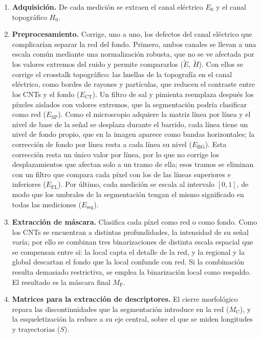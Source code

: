 \begin{enumerate}
    \item \textbf{Adquisición.} De cada medición se extraen el canal eléctrico $E_0$ y el canal topográfico $H_0$.
    \item \textbf{Preprocesamiento.} Corrige, uno a uno, los defectos del canal eléctrico que complicarían separar la red del fondo. Primero, ambos canales se llevan a una escala común mediante una normalización robusta, que no se ve afectada por los valores extremos del ruido y permite compararlos ($\tilde E$, $\tilde H$). Con ellos se corrige el crosstalk topográfico: las huellas de la topografía en el canal eléctrico, como bordes de rayones y partículas, que reducen el contraste entre los CNTs y el fondo ($E_{\mathrm{CT}}$). Un filtro de sal y pimienta reemplaza después los píxeles aislados con valores extremos, que la segmentación podría clasificar como red ($E_{\mathrm{SP}}$). Como el microscopio adquiere la matriz línea por línea y el nivel de base de la señal se desplaza durante el barrido, cada línea tiene un nivel de fondo propio, que en la imagen aparece como bandas horizontales; la corrección de fondo por línea resta a cada línea su nivel ($E_{\mathrm{BG}}$). Esta corrección resta un único valor por línea, por lo que no corrige los desplazamientos que afectan solo a un tramo de ella; esos tramos se eliminan con un filtro que compara cada píxel con los de las líneas superiores e inferiores ($E_{\mathrm{FL}}$). Por último, cada medición se escala al intervalo $[0,1]$, de modo que los umbrales de la segmentación tengan el mismo significado en todas las mediciones ($E_{\mathrm{seg}}$).
    \item \textbf{Extracción de máscara.} Clasifica cada píxel como red o como fondo. Como los CNTs se encuentran a distintas profundidades, la intensidad de su señal varía; por ello se combinan tres binarizaciones de distinta escala espacial que se compensan entre sí: la local capta el detalle de la red, y la regional y la global descartan el fondo que la local confunde con red. Si la combinación resulta demasiado restrictiva, se emplea la binarización local como respaldo. El resultado es la máscara final $M_{\mathrm{F}}$.
    \item \textbf{Matrices para la extracción de descriptores.} El cierre morfológico repara las discontinuidades que la segmentación introduce en la red ($M_{\mathrm{C}}$), y la esqueletización la reduce a su eje central, sobre el que se miden longitudes y trayectorias ($S$).

\end{enumerate}
